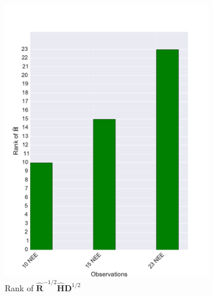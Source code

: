 \documentclass[11pt]{article}
\begin{document}
\begin{figure}[ht]
    \centering
    \begin{subfigure}[b]{0.49\textwidth}
        \includegraphics[width=\textwidth]{dalec2_obsrankcvt.pdf}
        \caption{Rank of $\hat{\textbf{R}}^{-1/2}\hat{\textbf{H}}\textbf{D}^{1/2}$}
        \label{fig:D2_observailityrankcvt}
    \end{subfigure}
    \begin{subfigure}[b]{0.49\textwidth}

\end{subfigure}
\end{figure}
\end{document}
